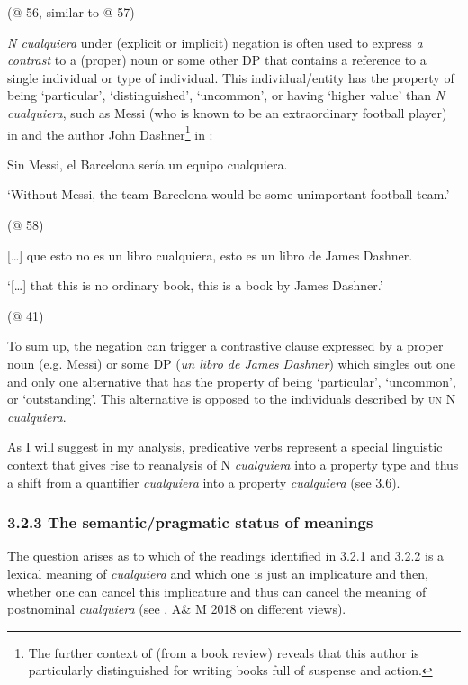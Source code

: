 \documentclass[output=paper]{langscibook}
\begin{document}
  (@ 56, similar to @ 57)

\textit{N cualquiera} under (explicit or implicit) negation is often used to express \textit{a contrast}\textbf{ }to a (proper) noun or some other DP that contains a reference to a single individual or type of individual. This individual/entity has the property of being ‘particular’, ‘distinguished’, ‘uncommon’, or having ‘higher value’ than \textit{N cualquiera}, such as Messi (who is known to be an extraordinary football player) in  and the author John Dashner\footnote{The further context of  (from a book review) reveals that this author is particularly distinguished for writing books full of suspense and action.} in :

\label{bkm:Ref66615171}  Sin Messi, el Barcelona sería un equipo cualquiera.

  ‘Without Messi, the team Barcelona would be some unimportant football team.’

  (@ 58)

\label{bkm:Ref150779604}  […] que esto no es un libro cualquiera, esto es un libro de James Dashner.

  ‘[…] that this is no ordinary book, this is a book by James Dashner.’

  (@ 41)

To sum up, the negation can trigger a contrastive clause expressed by a proper noun (e.g. Messi) or some DP (\textit{un libro de James Dashner}) which singles out one and only one alternative that has the property of being ‘particular’, ‘uncommon’, or ‘outstanding’. This alternative is opposed to the individuals described by \textsc{un} N \textit{cualquiera}.

  As I will suggest in my analysis, predicative verbs represent a special linguistic context that gives rise to reanalysis of N \textit{cualquiera} into a property type and thus a shift from a quantifier \textit{cualquiera} into a property \textit{cualquiera} (see 3.6). 

\subsubsection{\textbf{3.2.3} \textbf{The} \textbf{semantic/pragmatic} \textbf{status} \textbf{of} \textbf{meanings}}

The question arises as to which of the readings identified in 3.2.1 and 3.2.2 is a lexical meaning of \textit{cualquiera} and which one is just an implicature and then, whether one can cancel this implicature and thus can cancel the meaning of postnominal \textit{cualquiera} (see \citealt{Aloni2021}, A\& M 2018 on different views).
\end{document}
